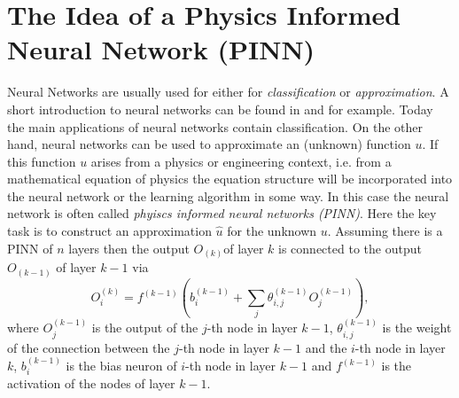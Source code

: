 \documentclass[a4paper,11pt]{article}
\begin{document}

\section{The Idea of a Physics Informed Neural Network (PINN)}

Neural Networks are usually used for either for \emph{classification} or \emph{approximation}. A short introduction to neural networks can be found in \cite{rojas1993neuronale} and \cite[pp. 809]{stoecker1995formeln} for example. Today the main applications of neural networks contain classification. On the other hand, neural networks can be used to approximate an (unknown) function $u$. If this function $u$ arises from a physics or engineering context, i.e. from a mathematical equation of  physics the equation structure will be incorporated into the neural network or the learning algorithm in some way. In this case the neural network is often called \emph{phyiscs informed neural networks (PINN)}. Here the key task is to construct an approximation $ \hat{u} $ for the unknown $u$. Assuming there is a PINN of $n$ layers then the output $O_{(k)} $of layer $k$ is connected to the output $O_{(k-1)} $ of layer $k-1$ via
\begin{equation*}
O^{(k)}_i = f^{(k-1)}\left( b^{(k-1)}_i + \sum_j \theta^{(k-1)}_{i,j} O^{(k-1)}_j \right),
\end{equation*}
where $ O^{(k-1)}_j $ is  the output of the $j$-th node in layer $k-1$, $ \theta^{(k-1)}_{i,j} $ is the weight of the connection between  the $j$-th node in layer $k-1$ and the $i$-th node in layer $k$, $ b^{(k-1)}_i $ is the bias neuron of $i$-th node in layer $k-1$ and $f^{(k-1)}$ is the activation of the nodes of layer $k-1$.
\end{document}
